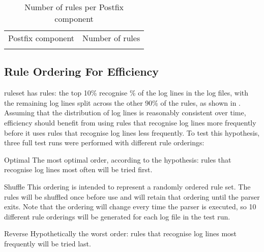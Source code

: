 

\begin{table}[thbp]
    \caption{Number of rules per Postfix component}
    \empty{}\label{Number of rules per Postfix component}
    \centering{}
    \begin{tabular}{lr}
        \tabletopline{}%
        Postfix component & Number of rules \\
        \tablemiddleline{}%
        
        \tablebottomline{}%
    \end{tabular}
\end{table}

\FloatBarrier{}

\subsection{Rule Ordering For Efficiency}

\label{rule ordering for efficiency}

\parsernames{} ruleset has \numberOFrules{} rules: the top 10\% recognise
\% of the log lines in the
\numberOFlogFILES{} log files, with the remaining log lines split across
the other 90\% of the rules, as shown in .
Assuming that the distribution of log lines is reasonably consistent over
time, \parsernames{} efficiency should benefit from using rules that
recognise log lines more frequently before it uses rules that recognise log
lines less frequently.  To test this hypothesis, three full test runs were
performed with different rule orderings:

\begin{boldeqlist}

    \item [Optimal]  The most optimal order, according to the hypothesis:
        rules that recognise log lines most often will be tried first.

    \item [Shuffle] This ordering is intended to represent a randomly
        ordered rule set.  The rules will be shuffled once before use and
        will retain that ordering until the parser exits.  Note that the
        ordering will change every time the parser is executed, so 10
        different rule orderings will be generated for each log file in the
        test run.

    \item [Reverse] Hypothetically the worst order: rules that recognise
        log lines most frequently will be tried last.

\end{boldeqlist}

